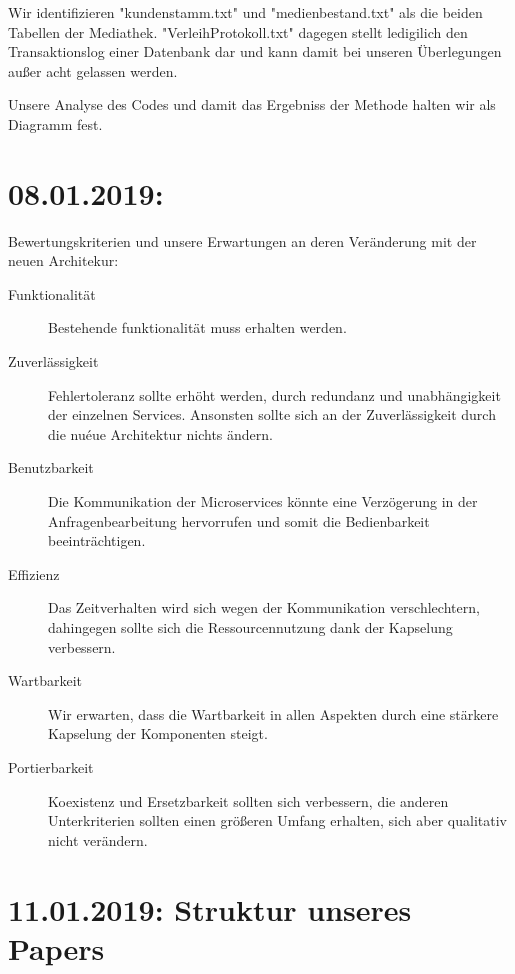 \documentclass{article}
\begin{document}
Wir identifizieren "kundenstamm.txt" und "medienbestand.txt" als die beiden Tabellen der Mediathek. "VerleihProtokoll.txt" dagegen stellt ledigilich den Transaktionslog einer Datenbank dar und kann damit bei unseren Überlegungen außer acht gelassen werden.

Unsere Analyse des Codes und damit das Ergebniss der Methode halten wir als Diagramm fest.

\section{08.01.2019:}

Bewertungskriterien und unsere Erwartungen an deren Veränderung mit der neuen Architekur:
\begin{description}
    \item[Funktionalität] Bestehende funktionalität muss erhalten werden.
    \item[Zuverlässigkeit] Fehlertoleranz sollte erhöht werden, durch redundanz und unabhängigkeit der einzelnen Services. Ansonsten sollte sich an der Zuverlässigkeit durch die nuéue Architektur nichts ändern.
    \item[Benutzbarkeit] Die Kommunikation der Microservices könnte eine Verzögerung in der Anfragenbearbeitung hervorrufen und somit die Bedienbarkeit beeinträchtigen.
    \item[Effizienz] Das Zeitverhalten wird sich wegen der Kommunikation verschlechtern, dahingegen sollte sich die Ressourcennutzung dank der Kapselung verbessern.
    \item[Wartbarkeit] Wir erwarten, dass die Wartbarkeit in allen Aspekten durch eine stärkere Kapselung der Komponenten steigt.
    \item[Portierbarkeit] Koexistenz und Ersetzbarkeit sollten sich verbessern, die anderen Unterkriterien sollten einen größeren Umfang erhalten, sich aber qualitativ nicht verändern.
\end{description}

\section{11.01.2019: Struktur unseres Papers}
\end{document}
